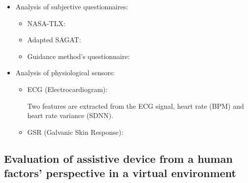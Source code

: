 \begin{itemize}
    \item Analysis of subjective questionnaires:
    \begin{itemize}
        \item NASA-TLX: %
        \item Adapted SAGAT: %
        \item Guidance method's questionnaire: %
    \end{itemize}
    \item Analysis of physiological sensors:
    \begin{itemize}
        \item ECG (Electrocardiogram): 
        
        Two features are extracted from the ECG signal, heart rate (BPM) and heart rate variance (SDNN).%
        
        \item GSR (Galvanic Skin Response): %
    \end{itemize}
\end{itemize}

\subsection{Evaluation of assistive device from a human factors' perspective in a virtual environment}
\label{sec:results_obj_1}





